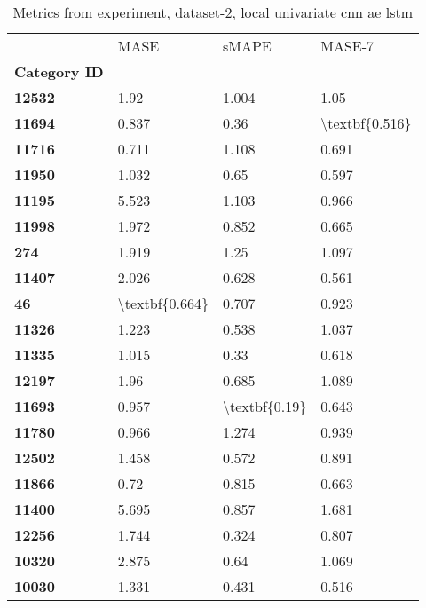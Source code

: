 \begin{table}[h]
\centering
\caption{Metrics from experiment, dataset-2, local univariate cnn ae lstm}
\label{table:local-univariate-cnn-ae-lstm-dataset-2}
\begin{tabular}{llll}
\toprule
{} &            MASE &          sMAPE &          MASE-7 \\
\textbf{Category ID} &                 &                &                 \\
\midrule
\textbf{12532      } &            1.92 &          1.004 &            1.05 \\
\textbf{11694      } &           0.837 &           0.36 &  \textbackslash textbf\{0.516\} \\
\textbf{11716      } &           0.711 &          1.108 &           0.691 \\
\textbf{11950      } &           1.032 &           0.65 &           0.597 \\
\textbf{11195      } &           5.523 &          1.103 &           0.966 \\
\textbf{11998      } &           1.972 &          0.852 &           0.665 \\
\textbf{274        } &           1.919 &           1.25 &           1.097 \\
\textbf{11407      } &           2.026 &          0.628 &           0.561 \\
\textbf{46         } &  \textbackslash textbf\{0.664\} &          0.707 &           0.923 \\
\textbf{11326      } &           1.223 &          0.538 &           1.037 \\
\textbf{11335      } &           1.015 &           0.33 &           0.618 \\
\textbf{12197      } &            1.96 &          0.685 &           1.089 \\
\textbf{11693      } &           0.957 &  \textbackslash textbf\{0.19\} &           0.643 \\
\textbf{11780      } &           0.966 &          1.274 &           0.939 \\
\textbf{12502      } &           1.458 &          0.572 &           0.891 \\
\textbf{11866      } &            0.72 &          0.815 &           0.663 \\
\textbf{11400      } &           5.695 &          0.857 &           1.681 \\
\textbf{12256      } &           1.744 &          0.324 &           0.807 \\
\textbf{10320      } &           2.875 &           0.64 &           1.069 \\
\textbf{10030      } &           1.331 &          0.431 &           0.516 \\
\bottomrule
\end{tabular}
\end{table}
